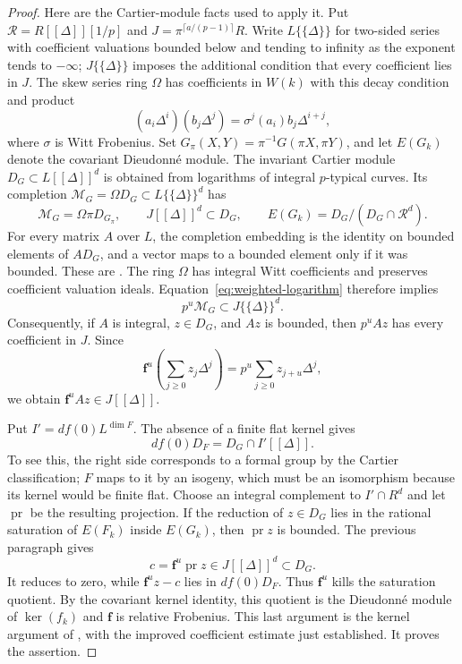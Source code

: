 \begin{proof}
Here are the Cartier-module facts used to apply it. Put $\mathcal R=R[[\Delta]][1/p]$ and $J=\pi^{\lceil a/(p-1)\rceil}R$. Write $L\{\{\Delta\}\}$ for two-sided series with coefficient valuations bounded below and tending to infinity as the exponent tends to $-\infty$; $J\{\{\Delta\}\}$ imposes the additional condition that every coefficient lies in $J$. The skew series ring $\Omega$ has coefficients in $W(k)$ with this decay condition and product
\[
 (a_i\Delta^i)(b_j\Delta^j)=\sigma^j(a_i)b_j\Delta^{i+j},
\]
where $\sigma$ is Witt Frobenius. Set $G_\pi(X,Y)=\pi^{-1}G(\pi X,\pi Y)$, and let $E(G_k)$ denote the covariant Dieudonn\'e module. The invariant Cartier module $D_G\subset L[[\Delta]]^d$ is obtained from logarithms of integral $p$-typical curves. Its completion $\mathcal M_G=\Omega D_G\subset L\{\{\Delta\}\}^d$ has
\[
 \mathcal M_G=\Omega\pi D_{G_\pi},\qquad
 J[[\Delta]]^d\subset D_G,
 \qquad E(G_k)=D_G/(D_G\cap\mathcal R^d).
\]
For every matrix $A$ over $L$, the completion embedding is the identity on bounded elements of $AD_G$, and a vector maps to a bounded element only if it was bounded. These are \citet[Proposition~9 and Lemma~3, p.~674; Proposition~10(4), p.~675; Proposition~11(1)--(2), pp.~675--676]{Bondarko2006}. The ring $\Omega$ has integral Witt coefficients and preserves coefficient valuation ideals. Equation~\eqref{eq:weighted-logarithm} therefore implies
\[
                         p^u\mathcal M_G\subset J\{\{\Delta\}\}^d.
\]
Consequently, if $A$ is integral, $z\in D_G$, and $Az$ is bounded, then $p^uAz$ has every coefficient in $J$. Since
\[
 \mathbf f^u\left(\sum_{j\ge0}z_j\Delta^j\right)
                  =p^u\sum_{j\ge0}z_{j+u}\Delta^j,
\]
we obtain $\mathbf f^uAz\in J[[\Delta]]$.

Put $I'=df(0)L^{\dim F}$. The absence of a finite flat kernel gives
\[
                  df(0)D_F=D_G\cap I'[[\Delta]].
\]
To see this, the right side corresponds to a formal group by the Cartier classification; $F$ maps to it by an isogeny, which must be an isomorphism because its kernel would be finite flat. Choose an integral complement to $I'\cap R^d$ and let $\operatorname{pr}$ be the resulting projection. If the reduction of $z\in D_G$ lies in the rational saturation of $E(F_k)$ inside $E(G_k)$, then $\operatorname{pr}z$ is bounded. The previous paragraph gives
\[
 c=\mathbf f^u\operatorname{pr}z\in J[[\Delta]]^d\subset D_G.
\]
It reduces to zero, while $\mathbf f^uz-c$ lies in $df(0)D_F$. Thus $\mathbf f^u$ kills the saturation quotient. By the covariant kernel identity, this quotient is the Dieudonn\'e module of $\ker(f_k)$ and $\mathbf f$ is relative Frobenius. This last argument is the kernel argument of \citet[Proposition~16 and proof, p.~681; Theorem~2(8), equation~(6), p.~668]{Bondarko2006}, with the improved coefficient estimate just established. It proves the assertion.
\end{proof}

